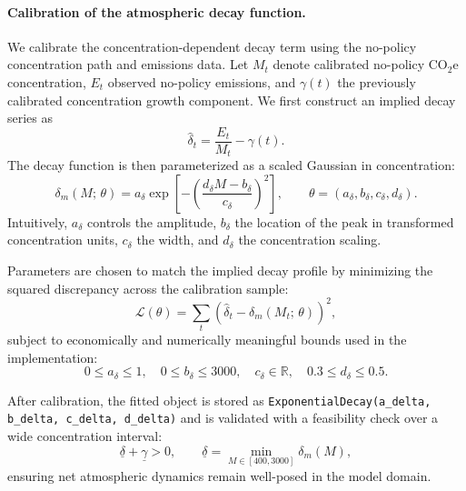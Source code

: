 \paragraph{Calibration of the atmospheric decay function.}
We calibrate the concentration-dependent decay term using the no-policy concentration path and emissions data. Let $M_t$ denote calibrated no-policy $\mathrm{CO_2e}$ concentration, $E_t$ observed no-policy emissions, and $\gamma(t)$ the previously calibrated concentration growth component. We first construct an implied decay series as
\begin{equation}
\hat{\delta}_t = \frac{E_t}{M_t} - \gamma(t).
\end{equation}
The decay function is then parameterized as a scaled Gaussian in concentration:
\begin{equation}
\delta_m(M;\,\theta) = a_\delta \exp\!\left[-\left(\frac{d_\delta M - b_\delta}{c_\delta}\right)^2\right],
\qquad
\theta = (a_\delta,b_\delta,c_\delta,d_\delta).
\end{equation}
Intuitively, $a_\delta$ controls the amplitude, $b_\delta$ the location of the peak in transformed concentration units, $c_\delta$ the width, and $d_\delta$ the concentration scaling.

Parameters are chosen to match the implied decay profile by minimizing the squared discrepancy across the calibration sample:
\begin{equation}
\mathcal{L}(\theta) = \sum_t \left(\hat{\delta}_t - \delta_m(M_t;\,\theta)\right)^2,
\end{equation}
subject to economically and numerically meaningful bounds used in the implementation:
\begin{equation}
0 \le a_\delta \le 1,\quad 0 \le b_\delta \le 3000,\quad c_\delta \in \mathbb{R},\quad 0.3 \le d_\delta \le 0.5.
\end{equation}

After calibration, the fitted object is stored as \texttt{ExponentialDecay(a\_delta, b\_delta, c\_delta, d\_delta)} and is validated with a feasibility check over a wide concentration interval:
\begin{equation}
\underline{\delta} + \underline{\gamma} > 0,
\qquad
\underline{\delta} = \min_{M \in [400,3000]} \delta_m(M),
\end{equation}
ensuring net atmospheric dynamics remain well-posed in the model domain.
